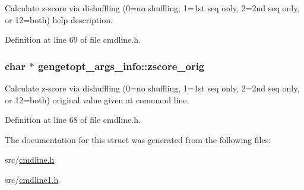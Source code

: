 Calculate z-\/score via dishuffling (0=no shuffling, 1=1st seq only, 2=2nd seq only, or 12=both) help description. 



Definition at line 69 of file cmdline.\+h.

\hypertarget{structgengetopt__args__info_aab048214690b4bb2aef5468cf1f796c8}{
\subsubsection[{zscore\+\_\+orig}]{\setlength{\rightskip}{0pt plus 5cm}char $\ast$ gengetopt\+\_\+args\+\_\+info\+::zscore\+\_\+orig}}\label{structgengetopt__args__info_aab048214690b4bb2aef5468cf1f796c8}


Calculate z-\/score via dishuffling (0=no shuffling, 1=1st seq only, 2=2nd seq only, or 12=both) original value given at command line. 



Definition at line 68 of file cmdline.\+h.



The documentation for this struct was generated from the following files\+:\begin{DoxyCompactItemize}
\item 
src/\hyperlink{cmdline_8h}{cmdline.\+h}\item 
src/\hyperlink{cmdline1_8h}{cmdline1.\+h}\end{DoxyCompactItemize}
